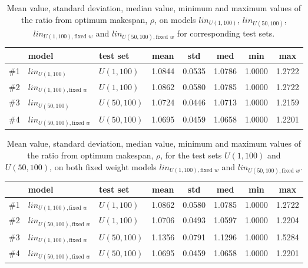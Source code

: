 \documentclass[10pt]{llncs}
\begin{document}
\begin{table}[h!]
 {\footnotesize
 \begin{center}
  \begin{tabular}{|c|l|l|ccccc|}
   \hline\hline
   & model & test set & mean & std    & med    & min    & max   \\ \hline
\#1 & $lin_{U(1,100)}$ & $U(1,100)$ & 1.0844 & 0.0535 & 1.0786 & 1.0000 & 1.2722  \\
\#2 & $lin_{U(1,100),\textrm{fixed }w}$ & $U(1,100)$ & 1.0862 & 0.0580 & 1.0785 & 1.0000 & 1.2722   \\
\#3 & $lin_{U(50,100)}$ & $U(50,100)$ & 1.0724 & 0.0446&1.0713 & 1.0000 & 1.2159  \\
\#4 & $lin_{U(50,100),\textrm{fixed }w}$ & $U(50,100)$ &  1.0695 & 0.0459 & 1.0658 & 1.0000 & 1.2201  \\
   \hline\hline
  \end{tabular}
 \end{center}}
\caption{Mean value, standard deviation, median value, minimum and maximum values of the ratio from optimum makespan, $\rho$, on models $lin_{U(1,100)}$, $lin_{U(50,100)}$, $lin_{U(1,100),\textrm{fixed }w}$ and $lin_{U(50,100),\textrm{fixed }w}$ for corresponding test sets.}
 \label{tbl:fixedvsvaried}
\end{table}


\begin{table}[h!]
 {\footnotesize
 \begin{center}
  \begin{tabular}{|c|l|l|ccccc|}
   \hline\hline
   & model & test set & mean & std    & med    & min    & max   \\ \hline
\#1 & $lin_{U(1,100),\textrm{fixed }w}$ & $U(1,100)$ & 1.0862 & 0.0580 & 1.0785 & 1.0000 & 1.2722   \\
\#2 & $lin_{U(50,100),\textrm{fixed }w}$ & $U(1,100)$ & 1.0706 & 0.0493 & 1.0597 & 1.0000 & 1.2204  \\
\#3 & $lin_{U(1,100),\textrm{fixed }w}$ & $U(50,100)$ &   1.1356 & 0.0791 & 1.1296 & 1.0000 & 1.5284  \\
\#4 & $lin_{U(50,100),\textrm{fixed }w}$ & $U(50,100)$ &  1.0695 & 0.0459 & 1.0658 & 1.0000 & 1.2201  \\
   \hline\hline
  \end{tabular}
 \end{center}}
 \caption{Mean value, standard deviation, median value, minimum and maximum values of the ratio from optimum makespan, $\rho$, for the test sets $U(1,100)$ and $U(50,100)$, on both fixed weight models $lin_{U(1,100),\textrm{fixed }w}$ and $lin_{U(50,100),\textrm{fixed }w}$.}
 \label{tbl:diffdatadistr:fixed}
\end{table}
\end{document}
